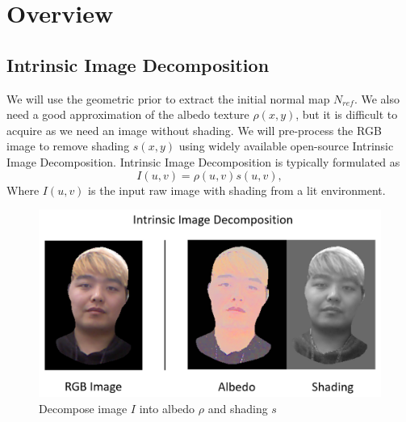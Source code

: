 \documentclass[10pt,twocolumn,letterpaper]{article}
\begin{document}
\section{Overview}
\subsection{Intrinsic Image Decomposition}
We will use the geometric prior to extract the initial normal map $N_{ref}$. We also need a good approximation of the albedo texture $\rho(x,y)$, but it is difficult to acquire as we need an image without shading. We will pre-process the RGB image to remove shading $s(x,y)$ using widely available open-source Intrinsic Image Decomposition\cite{bell}. Intrinsic Image Decomposition is typically formulated as 
\begin{equation}
I(u,v) = \rho(u,v)s(u,v),
\end{equation}
Where $I(u,v)$ is the input raw image with shading from a lit environment. 
\begin{figure}[!h]
    \begin{center}
        \includegraphics [scale=0.3] {image/intrinsic.png}
    \end{center}
    \caption{Decompose image $I$ into albedo $\rho$ and shading $s$}
    \label{fig:pipe1}
\end{figure} 
\end{document}
